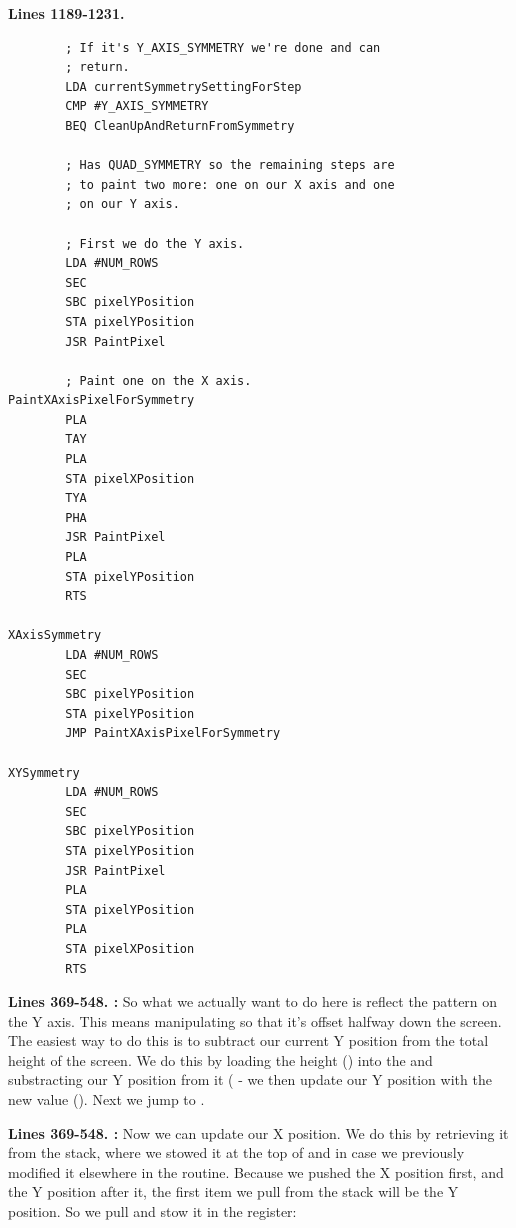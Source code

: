 \clearpage
\textbf{Lines 1189-1231. }
\begin{lstlisting}
        ; If it's Y_AXIS_SYMMETRY we're done and can 
        ; return.
        LDA currentSymmetrySettingForStep
        CMP #Y_AXIS_SYMMETRY
        BEQ CleanUpAndReturnFromSymmetry

        ; Has QUAD_SYMMETRY so the remaining steps are
        ; to paint two more: one on our X axis and one
        ; on our Y axis.

        ; First we do the Y axis.
        LDA #NUM_ROWS
        SEC 
        SBC pixelYPosition
        STA pixelYPosition
        JSR PaintPixel

        ; Paint one on the X axis.
PaintXAxisPixelForSymmetry    
        PLA 
        TAY 
        PLA 
        STA pixelXPosition
        TYA 
        PHA 
        JSR PaintPixel
        PLA 
        STA pixelYPosition
        RTS 

XAxisSymmetry   
        LDA #NUM_ROWS
        SEC 
        SBC pixelYPosition
        STA pixelYPosition
        JMP PaintXAxisPixelForSymmetry

XYSymmetry   
        LDA #NUM_ROWS
        SEC 
        SBC pixelYPosition
        STA pixelYPosition
        JSR PaintPixel
        PLA 
        STA pixelYPosition
        PLA 
        STA pixelXPosition
        RTS 
\end{lstlisting}
\clearpage

\textbf{Lines 369-548. :} So what we actually want to do here is reflect the pattern on the Y axis. This means manipulating  so that it's
offset halfway down the screen.  The easiest way to do this is to subtract our current Y position from the total height of the screen.
We do this by loading the height () into the  and substracting our Y position from it 
( - we then update our Y position with the new value (). Next we jump to
.

\textbf{Lines 369-548. :} Now we can update our X position. We do this by retrieving it
from the stack, where we stowed it at the top of  and in case we previously modified it elsewhere in the routine. 
Because we pushed the X position first, and the Y position after it, the first item we pull from the stack will be the Y position.
So we pull and stow it in the  register:

